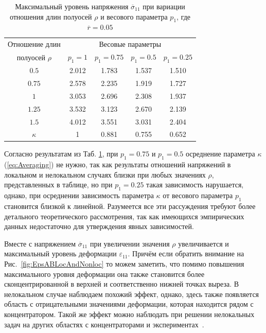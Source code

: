 \begin{table}[htbp]
    \centering
    \begin{threeparttable}%
        \caption{Максимальный уровень напряжения $\overline{\sigma}_{11}$ при вариации отношения длин полуосей $\rho$ и весового параметра $p_1$, где $\overline{r} = 0.05$}\label{tab:MaxStress}%
        \begin{tabular}{|c|c|c|c|c|}
	        \hline
			Отношение длин    & \multicolumn{4}{c|}{Весовые параметры} \\
			\cline{2-5}
			полуосей $\rho$   & $p_1 = 1$ & $p_1 = 0.75$ & $p_1 = 0.5$ & $p_1 = 0.25$ \\
			\hline
			$0.5$             & 2.012     & 1.783        & 1.537       & 1.510 \\
			\hline
			$0.75$            & 2.578     & 2.235        & 1.919       & 1.727 \\
			\hline
			$1$               & 3.053     & 2.696        & 2.308       & 1.937 \\
			\hline
			$1.25$            & 3.532     & 3.123        & 2.670       & 2.139 \\
			\hline
			$1.5$             & 4.012     & 3.551        & 3.031       & 2.404 \\
			\hline
			$\kappa$          & 1         & 0.881        & 0.755       & 0.652 \\
			\hline
        \end{tabular}
    \end{threeparttable}
\end{table}

Согласно результатам из Таб. \ref{tab:MaxStress}, при $p_1 = 0.75$ и $p_1 = 0.5$ осреднение параметра $\kappa$ (\ref{eq:Averaging}) не нужно, так как результаты отношений напряжений в локальном и нелокальном случаях близки при любых значениях $\rho$, представленных в таблице, но при $p_1 = 0.25$ такая зависимость нарушается, однако, при осреднении зависимость параметра $\kappa$ от весового параметра $p_1$ становится близкой к линейной. Разумеется все эти рассуждения требуют более детального теоретического рассмотрения, так как имеющихся эмпирических данных недостаточно для утверждения явных зависимостей.

Вместе с напряжением $\overline{\sigma}_{11}$ при увеличении значения $\rho$ увеличивается и максимальный уровень деформации $\varepsilon_{11}$. Причём если обратить внимание на Рис.~\ref{fig:EpsABLocAndNonloc} то можем заметить, что помимо повышения максимального уровня деформации она также становится более сконцентрированной в верхней и соответственно нижней точках выреза. В нелокальном случае наблюдаем похожий эффект, однако, здесь также появляется область с отрицательными значениями деформации, которая находится рядом с концентратором. Такой же эффект можно наблюдать при решении нелокальных задач на других областях с концентраторами \cite{ZAMM} и \mbox{экспериментах \cite{Andreev}.}


